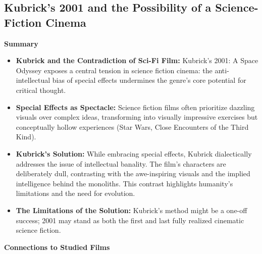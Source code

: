 \documentclass[11pt,fleqn]{book} %
\begin{document}
\subsection{Kubrick's 2001 and the Possibility of a Science-Fiction Cinema}

\textbf{Summary}

\begin{itemize}
\item \textbf{Kubrick and the Contradiction of Sci-Fi Film:}  Kubrick's 2001: A Space Odyssey exposes a central tension in science fiction cinema: the anti-intellectual bias of special effects undermines the genre's core potential for critical thought. 

\item \textbf{Special Effects as Spectacle:} Science fiction films often prioritize dazzling visuals over complex ideas, transforming into visually impressive exercises but conceptually hollow experiences (Star Wars, Close Encounters of the Third Kind).

\item \textbf{Kubrick's Solution:} While embracing special effects, Kubrick dialectically addresses the issue of intellectual banality. The film's characters are deliberately  dull, contrasting with the awe-inspiring visuals and the implied intelligence behind the monoliths. This contrast highlights  humanity's limitations and the need for evolution.

\item \textbf{The Limitations of the Solution:} Kubrick's method might be a one-off success;  2001  may stand as both the first and last fully realized cinematic science fiction. 
\end{itemize}
\vspace{5pt}
\textbf{Connections to Studied Films}
\end{document}
